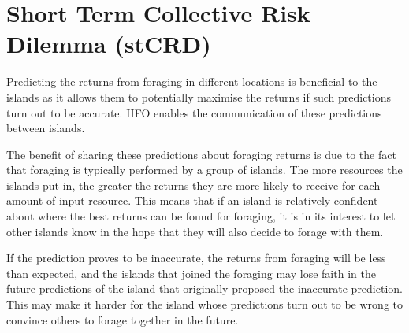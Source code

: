 \section{Short Term Collective Risk Dilemma (stCRD)}
\label{sec:IIFO:stCRD}

Predicting the returns from foraging in different locations is beneficial to the islands as it allows them to potentially maximise the returns if such predictions turn out to be accurate. IIFO enables the communication of these predictions between islands.

The benefit of sharing these predictions about foraging returns is due to the fact that foraging is typically performed by a group of islands. The more resources the islands put in, the greater the returns they are more likely to receive for each amount of input resource. This means that if an island is relatively confident about where the best returns can be found for foraging, it is in its interest to let other islands know in the hope that they will also decide to forage with them.

If the prediction proves to be inaccurate, the returns from foraging will be less than expected, and the islands that joined the foraging may lose faith in the future predictions of the island that originally proposed the inaccurate prediction. This may make it harder for the island whose predictions turn out to be wrong to convince others to forage together in the future.
